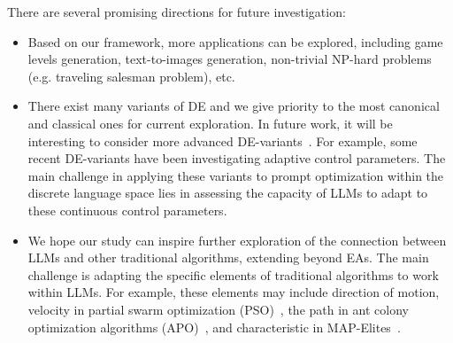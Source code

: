 There are several promising directions for future investigation:
\begin{itemize}[leftmargin=*]
    \item Based on our framework, more applications can be explored, including game levels generation, text-to-images generation, non-trivial NP-hard problems (e.g. traveling salesman problem), etc. 
    \item There exist many variants of DE and we give priority to the most canonical and classical ones for current exploration. In future work, it will be interesting to consider more advanced DE-variants~\citep{das2016recent,das2010differential}. For example, some recent DE-variants have been investigating adaptive control parameters. The main challenge in applying these variants to prompt optimization within the discrete language space lies in assessing the capacity of LLMs to adapt to these continuous control parameters.
    \item We hope our study can inspire further exploration of the connection between LLMs and other traditional algorithms, extending beyond EAs. The main challenge is adapting the specific elements of traditional algorithms to work within LLMs. For example, these elements may include direction of motion, velocity in partial swarm optimization (PSO)~\citep{kennedy1995particle}, the path in ant colony optimization algorithms (APO)~\citep{dorigo1997ant}, and characteristic in MAP-Elites~\citep{mouret2015illuminating}.
\end{itemize}



